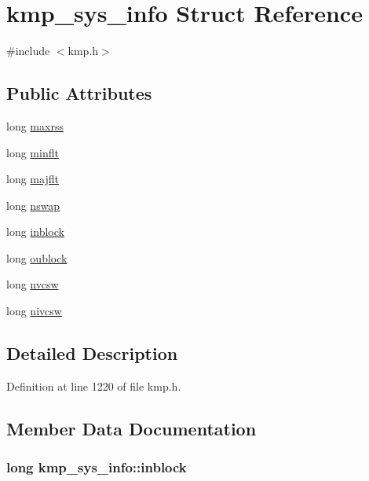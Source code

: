 \hypertarget{structkmp__sys__info}{\section{kmp\-\_\-sys\-\_\-info Struct Reference}
\label{structkmp__sys__info}
}


{\ttfamily \#include $<$kmp.\-h$>$}

\subsection*{Public Attributes}
\begin{DoxyCompactItemize}
\item 
long \hyperlink{structkmp__sys__info_af2816624ab3d81d5955b91761aa533fa}{maxrss}
\item 
long \hyperlink{structkmp__sys__info_a02a36302bc462405fae7b4d7309a7370}{minflt}
\item 
long \hyperlink{structkmp__sys__info_a2831ec7e3cd6546b2e04cfc9afe2c2cf}{majflt}
\item 
long \hyperlink{structkmp__sys__info_aba9c0c66063cc7bdba0b84d87f90b25b}{nswap}
\item 
long \hyperlink{structkmp__sys__info_a0ce85c6a66e6805ed1a8948e7f19d79f}{inblock}
\item 
long \hyperlink{structkmp__sys__info_ab55bb38f87dbda622851940106f8a1c0}{oublock}
\item 
long \hyperlink{structkmp__sys__info_a82b3d7c37a16144f173a69624ef27057}{nvcsw}
\item 
long \hyperlink{structkmp__sys__info_ac7e30691b19415226d39bd4ed92af7a6}{nivcsw}
\end{DoxyCompactItemize}


\subsection{Detailed Description}


Definition at line 1220 of file kmp.\-h.



\subsection{Member Data Documentation}
\hypertarget{structkmp__sys__info_a0ce85c6a66e6805ed1a8948e7f19d79f}{
\subsubsection[{inblock}]{\setlength{\rightskip}{0pt plus 5cm}long kmp\-\_\-sys\-\_\-info\-::inblock}}\label{structkmp__sys__info_a0ce85c6a66e6805ed1a8948e7f19d79f}


